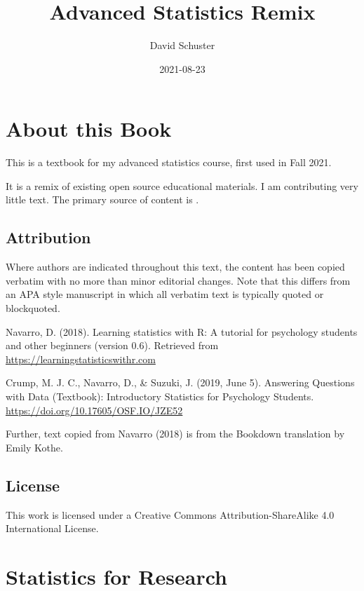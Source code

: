 \documentclass[
]{book}
\title{Advanced Statistics Remix}
\author{David Schuster}
\date{2021-08-23}
\begin{document}
\maketitle

{
\setcounter{tocdepth}{1}
\tableofcontents
}
\hypertarget{about-this-book}{%
\chapter*{About this Book}\label{about-this-book}}

This is a textbook for my advanced statistics course, first used in Fall 2021.

It is a remix of existing open source educational materials. I am contributing very little text. The primary source of content is \citet{Navarro2018}.

\hypertarget{attribution}{%
\section*{Attribution}\label{attribution}}

Where authors are indicated throughout this text, the content has been copied verbatim with no more than minor editorial changes. Note that this differs from an APA style manuscript in which all verbatim text is typically quoted or blockquoted.

Navarro, D. (2018). Learning statistics with R: A tutorial for psychology students and other beginners (version 0.6). Retrieved from \url{https://learningstatisticswithr.com}

Crump, M. J. C., Navarro, D., \& Suzuki, J. (2019, June 5). Answering Questions with Data (Textbook): Introductory Statistics for Psychology Students. \url{https://doi.org/10.17605/OSF.IO/JZE52}

Further, text copied from Navarro (2018) is from the Bookdown translation by Emily Kothe.

\hypertarget{license}{%
\section*{License}\label{license}}

This work is licensed under a Creative Commons Attribution-ShareAlike 4.0 International License.

\hypertarget{statistics-for-research}{%
\chapter{Statistics for Research}\label{statistics-for-research}}
\end{document}
